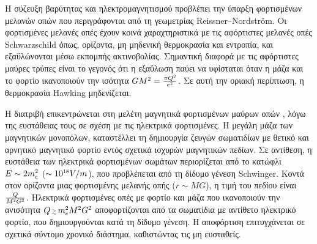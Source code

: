 \par Η σύζευξη βαρύτητας και ηλεκτρομαγνητισμού
προβλέπει την ύπαρξη φορτισμένων μελανών οπών που περιγράφονται από τη γεωμετρίας Reissner–Nordström.  
Οι φορτισμένες μελανές οπές έχουν κοινά χαραχτηριστικά με τις αφόρτιστες μελανές οπές Schwarzschild 
όπως, ορίζοντα, μη μηδενική θερμοκρασία και εντροπία, και εξαϋλώνονται μέσω εκπομπής ακτινοβολίας. 
Σημαντική διαφορά με τις αφόρτιστες μαύρες τρύπες 
είναι το γεγονός ότι η εξαΰλωση παύει να υφίσταται 
όταν η μάζα και το φορτίο ικανοποιούν την ισότητα $GM\superscr{2}=\frac{\pi Q\superscr{2}}{e\superscr{2}}$. Σε αυτή την οριακή περίπτωση, η θερμοκρασία Hawking μηδενίζεται. \\

\par Η διατριβή επικεντρώνεται στη μελέτη μαγνητικά φορτισμένων μαύρων οπών \cite{Maldacena_2021}, λόγω της ευστάθειας τους σε σχέση με τις ηλεκτρικά φορτισμένες. Η μεγάλη μάζα των μαγνητικών μονοπόλων, καταστέλλει τη δημιουργία ζευγών σωματιδίων με θετικό και αρνητικό μαγνητικό φορτίο εντός σχετικά ισχυρών μαγνητικών πεδίων. Σε αντίθεση, η ευστάθεια των ηλεκτρικά φορτισμένων σωμάτων περιορίζεται από το κατώφλι $E\sim 2m\subscr{e}\superscr{2}$ ($\sim 10\superscr{18}V/m$), που προβλέπεται από τη δίδυμο γένεση Schwinger. Κοντά στον ορίζοντα μιας φορτισμένης μελανής οπής ($r\sim MG$), η τιμή του πεδίου είναι $\frac{Q}{M\superscr{2}G\superscr{2}}$. Ηλεκτρικά φορτισμένες οπές με φορτίο και μάζα που ικανοποιούν την ανισότητα $Q\,{\scriptscriptstyle\gtrsim}\,m\subscr{e}\superscr{2}M\superscr{2}G\superscr{2}$
αποφορτίζονται από τα σωματίδια με αντίθετο ηλεκτρικό φορτίο, που δημιουργούνται κατά τη δίδυμο γένεση. Η αποφόρτιση επιτυγχάνεται σε σχετικά σύντομο χρονικό διάστημα, καθιστώντας τις μη ευσταθείς.\\

